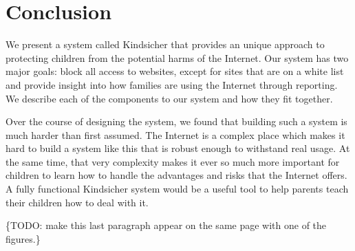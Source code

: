 
\section{Conclusion}

We present a system called Kindsicher that provides an unique approach to
protecting children from the potential harms of the Internet. Our system has
two major goals: block all access to websites, except for sites that are on a
white list and provide insight into how families are using the Internet through
reporting. We describe each of the components to our system and how they fit
together.

Over the course of designing the system, we found that building such a system
is much harder than first assumed. The Internet is a complex place which makes
it hard to build a system like this that is robust enough to withstand real
usage. At the same time, that very complexity makes it ever so much
more important for children to learn how to handle the advantages and risks
that the Internet offers.  A fully functional Kindsicher system would be a
useful tool to help parents teach their children how to deal with it.

\{TODO: make this last paragraph appear on the same page with one of the
figures.\}
